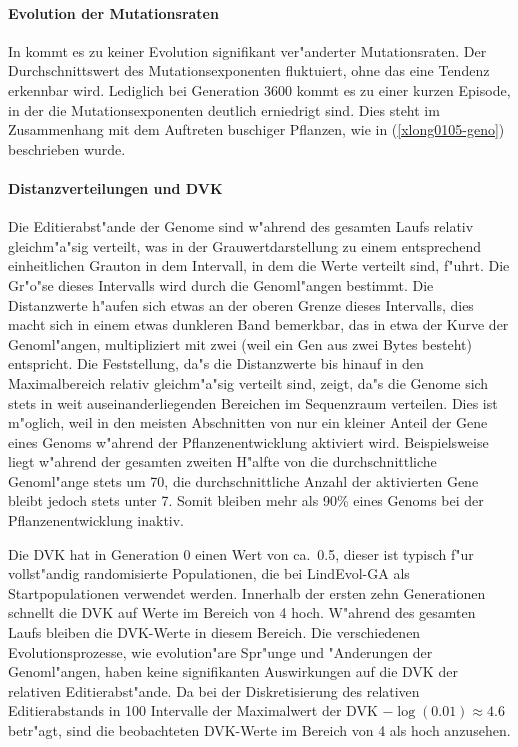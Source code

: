 \paragraph{Evolution der Mutationsraten}

In  kommt es zu keiner Evolution signifikant ver"anderter Mutationsraten. Der
Durchschnittswert des Mutationsexponenten fluktuiert, ohne das eine Tendenz erkennbar wird. Lediglich
bei Generation 3600 kommt es zu einer kurzen Episode, in der die Mutationsexponenten deutlich erniedrigt
sind. Dies steht im Zusammenhang mit dem Auftreten buschiger Pflanzen, wie in (\ref{xlong0105-geno})
beschrieben wurde.


\paragraph{Distanzverteilungen und DVK}

Die Editierabst"ande der Genome sind w"ahrend des gesamten Laufs relativ gleichm"a"sig verteilt, was
in der Grauwertdarstellung zu einem entsprechend einheitlichen Grauton in dem Intervall, in dem die
Werte verteilt sind, f"uhrt. Die Gr"o"se dieses Intervalls wird durch die Genoml"angen bestimmt.
Die Distanzwerte h"aufen sich etwas an der oberen Grenze dieses Intervalls, dies macht sich in einem
etwas dunkleren Band bemerkbar, das in etwa der Kurve der Genoml"angen, multipliziert mit zwei (weil
ein Gen aus zwei Bytes besteht) entspricht. Die Feststellung, da"s die Distanzwerte bis hinauf
in den Maximalbereich relativ gleichm"a"sig verteilt sind, zeigt, da"s die Genome sich stets in weit auseinanderliegenden
Bereichen im Sequenzraum verteilen. Dies ist m"oglich, weil in den meisten Abschnitten von 
nur ein kleiner Anteil der Gene eines Genoms w"ahrend der Pflanzenentwicklung aktiviert wird. Beispielsweise
liegt w"ahrend der gesamten zweiten H"alfte von  die durchschnittliche Genoml"ange stets um 70,
die durchschnittliche Anzahl der aktivierten Gene bleibt jedoch stets unter 7. Somit bleiben mehr als 90\%
eines Genoms bei der Pflanzenentwicklung inaktiv.

Die DVK hat in Generation 0 einen Wert von ca.\ 0.5, dieser ist typisch f"ur vollst"andig randomisierte
Populationen, die bei LindEvol-GA als Startpopulationen verwendet werden. Innerhalb der ersten zehn
Generationen schnellt die DVK auf Werte im Bereich von 4 hoch. W"ahrend des gesamten Laufs bleiben die
DVK-Werte in diesem Bereich. Die verschiedenen Evolutionsprozesse, wie evolution"are Spr"unge und "Anderungen
der Genoml"angen, haben keine signifikanten Auswirkungen auf die DVK der relativen Editierabst"ande.
Da bei der Diskretisierung des relativen Editierabstands in 100 Intervalle der Maximalwert der DVK
$-\log(0.01) \approx 4.6$ betr"agt, sind die beobachteten DVK-Werte im Bereich von 4 als hoch anzusehen.


